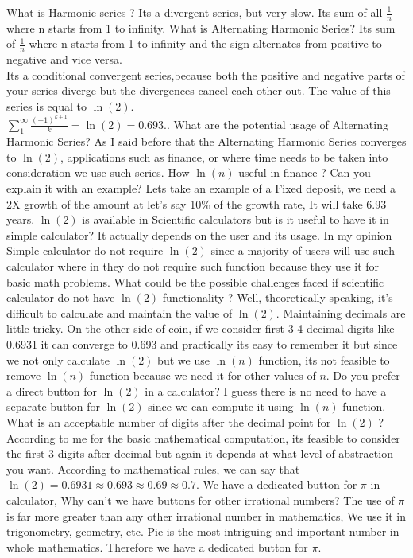 \documentclass{article}
\begin{document}
\begin{description}
\me What is Harmonic series ?
\prof Its a divergent series, but very slow. Its sum of all $\frac{1}{n}$ where n starts from 1 to infinity.
\me What is Alternating Harmonic Series?
\prof Its sum of $\frac{1}{n}$ where n starts from 1 to infinity and the sign alternates from positive to negative and vice versa.\\
Its a conditional convergent series,because both the positive and negative parts of your series diverge but the divergences cancel each other out. The value of this series is equal to $\ln(2)$. \\
$\sum_1^\infty{\frac{(-1)^{k+1}}{k}} = \ln(2) = 0.693..$
\me What are the potential usage of Alternating Harmonic Series?
\prof As I said before that the Alternating Harmonic Series converges to $\ln(2)$, applications such as finance, or where time needs to be taken into consideration we use such series.
\me How $\ln(n)$ useful in finance ? Can you explain it with an example?
\prof Lets take an example of a Fixed deposit, we need a 2X growth of the amount at let's say 10\% of the growth rate, It will take 6.93 years.
\me $\ln(2)$ is available in Scientific calculators but is it useful to have it in simple calculator?
\prof It actually depends on the user and its usage. In my opinion Simple calculator do not require $\ln(2)$ since a majority of users will use such calculator where in they do not require such function because they use it for basic math problems.
\me What could be the possible challenges faced if scientific calculator do not have $\ln(2)$ functionality ?
\prof Well, theoretically speaking, it's difficult to calculate and maintain the value of $\ln(2)$. Maintaining decimals are little tricky. On the other side of coin, if we consider first 3-4 decimal digits like 0.6931 it can converge to 0.693 and practically its easy to remember it but since we not only calculate $\ln(2)$ but we use $\ln(n)$ function, its not feasible to remove $\ln(n)$ function because we need it for other values of $n$.
\newpage
\me Do you prefer a direct button for $\ln(2)$ in a calculator?
\prof I guess there is no need to have a separate button for $\ln(2)$ since we can compute it using $\ln(n)$ function.
\me What is an acceptable number of digits after the decimal point for $\ln(2)$ ?
\prof According to me for the basic mathematical computation, its feasible to consider the first 3 digits after decimal but again it depends at what level of abstraction you want. According to mathematical rules, we can say that $\ln(2) = 0.6931 \approx 0.693 \approx 0.69 \approx 0.7$.
\me We have a dedicated button for $\pi$ in calculator, Why can't we have buttons for other irrational numbers?
\prof The use of $\pi$ is far more greater than any other irrational number in mathematics, We use it in trigonometry, geometry, etc. Pie is the most intriguing and important number in whole mathematics. Therefore we have a dedicated button for $\pi$.
\end{description}
\end{document}
